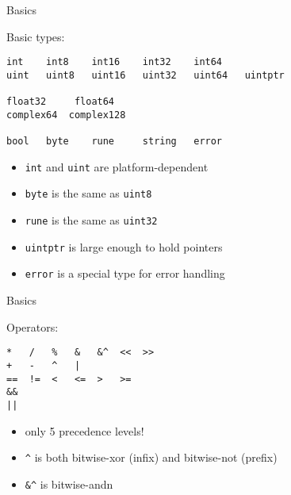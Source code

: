 \documentclass[10pt]{beamer}
\begin{document}

	\begin{frame}[t,fragile]{Basics}
		\begin{center}
			Basic types:
		\end{center}
		\begin{verbatim}
int    int8    int16    int32    int64
uint   uint8   uint16   uint32   uint64   uintptr

float32     float64
complex64  complex128

bool   byte    rune     string   error
		\end{verbatim}
		\vspace*{-4ex}
		\begin{itemize}
			\item \texttt{int} and \texttt{uint} are platform-dependent
			\item \texttt{byte} is the same as \texttt{uint8}
			\item \texttt{rune} is the same as \texttt{uint32}
			\item \texttt{uintptr} is large enough to hold pointers
			\item \texttt{error} is a special type for error handling
		\end{itemize}
\end{frame}
	
	
	\begin{frame}[t,fragile]{Basics}
		\begin{center}
			Operators:
		\end{center}
		\begin{verbatim}
*   /   %   &   &^  <<  >>
+   -   ^   |
==  !=  <   <=  >   >=
&&
||
		\end{verbatim}
		\vspace*{-4ex}
		\begin{itemize}
			\item only 5 precedence levels!
			\item \texttt{^} is both bitwise-xor (infix) and bitwise-not (prefix)
			\item \texttt{&^} is bitwise-andn
		\end{itemize}
\end{frame}
	
	
\end{document}
